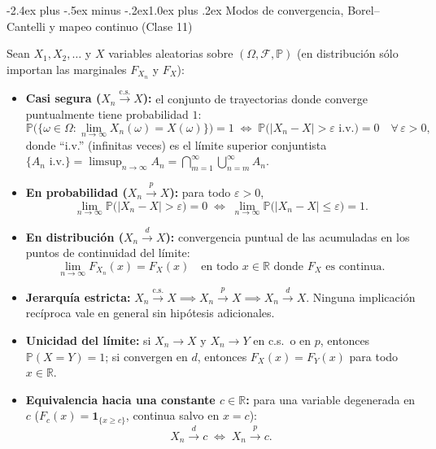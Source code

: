 \documentclass[10pt,a4paper]{article}
\makeatletter
\newcommand{\Prob}{\mathbb{P}}
\newcommand{\R}{\mathbb{R}}
\newcommand{\dto}{\xrightarrow{\;d\;}}
\newcommand{\pto}{\xrightarrow{\;p\;}}
\newcommand{\dcs}{\xrightarrow{\mathrm{c.s.}}}
\renewcommand\section{\@startsection{section}{1}{0pt}%
  {-2.4ex plus -.5ex minus -.2ex}{1.0ex plus .2ex}%
  {\normalfont\large\bfseries\color{seccolor}}}
\makeatother
\begin{document}
\section{Modos de convergencia, Borel--Cantelli y mapeo continuo \textmd{(Clase 11)}}

\begin{defbox}[frametitle={Los tres modos de convergencia estocástica}]
Sean $X_1, X_2, \dots$ y $X$ variables aleatorias sobre $(\Omega, \mathcal{F}, \Prob)$ (en distribución sólo importan las marginales $F_{X_n}$ y $F_X$):
\begin{itemize}
  \item \textbf{Casi segura ($X_n \dcs X$):} el conjunto de trayectorias donde converge puntualmente tiene probabilidad $1$:
  \[
  \Prob\big(\{\omega \in \Omega : \lim_{n\to\infty} X_n(\omega) = X(\omega)\}\big) = 1
  \;\Longleftrightarrow\;
  \Prob\big(|X_n - X| > \varepsilon \text{ i.v.}\big) = 0 \quad \forall\,\varepsilon > 0,
  \]
  donde ``i.v.'' (infinitas veces) es el límite superior conjuntista $\{A_n \text{ i.v.}\} = \limsup_{n\to\infty} A_n = \bigcap_{m=1}^\infty \bigcup_{n=m}^\infty A_n$.
  \item \textbf{En probabilidad ($X_n \pto X$):} para todo $\varepsilon > 0$,
  \[
  \lim_{n\to\infty} \Prob\big(|X_n - X| > \varepsilon\big) = 0
  \;\Longleftrightarrow\;
  \lim_{n\to\infty} \Prob\big(|X_n - X| \le \varepsilon\big) = 1.
  \]
  \item \textbf{En distribución ($X_n \dto X$):} convergencia puntual de las acumuladas en los puntos de continuidad del límite:
  \[
  \lim_{n\to\infty} F_{X_n}(x) = F_X(x) \quad \text{en todo } x \in \R \text{ donde } F_X \text{ es continua}.
  \]
\end{itemize}
\end{defbox}

\begin{thmbox}[frametitle={Jerarquía, unicidad del límite y equivalencia hacia una constante}]
\begin{itemize}
  \item \textbf{Jerarquía estricta:} $X_n \dcs X \implies X_n \pto X \implies X_n \dto X$. Ninguna implicación recíproca vale en general sin hipótesis adicionales.
  \item \textbf{Unicidad del límite:} si $X_n \to X$ y $X_n \to Y$ en c.s.\ o en $p$, entonces $\Prob(X = Y) = 1$; si convergen en $d$, entonces $F_X(x) = F_Y(x)$ para todo $x \in \R$.
  \item \textbf{Equivalencia hacia una constante $c \in \R$:} para una variable degenerada en $c$ ($F_c(x) = \mathbf{1}_{\{x \ge c\}}$, continua salvo en $x = c$):
  \[
  X_n \dto c \;\Longleftrightarrow\; X_n \pto c.
  \]
\end{itemize}
\end{thmbox}
\end{document}
